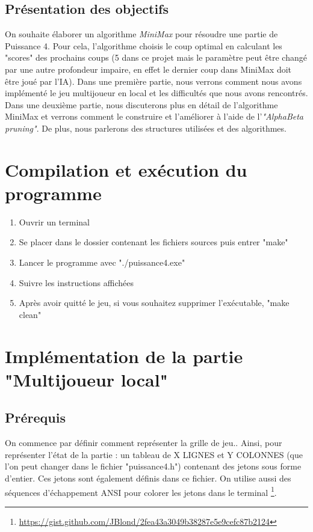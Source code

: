 \documentclass[a4paper,fleqn]{article}
\begin{document}
\subsection{Présentation des objectifs}

On souhaite élaborer un algorithme \textit{MiniMax} pour résoudre une partie de Puissance 4. Pour cela, l'algorithme choisis le coup optimal en calculant les "scores" des prochains coups (5 dans ce projet mais le paramètre peut être changé par une autre profondeur impaire, en effet le dernier coup dans MiniMax doit être joué par l'IA). Dans une première partie, nous verrons comment nous avons implémenté le jeu multijoueur en local et les difficultés que nous avons rencontrés. Dans une deuxième partie, nous discuterons plus en détail de l'algorithme MiniMax et verrons comment le construire et l'améliorer à l'aide de l'\textit{"AlphaBeta pruning"}. De plus, nous parlerons des structures utilisées et des algorithmes.

\section{Compilation et exécution du programme}

\begin{enumerate}
\item Ouvrir un terminal

\item Se placer dans le dossier contenant les fichiers sources puis entrer "make"

\item Lancer le programme avec "./puissance4.exe"

\item Suivre les instructions affichées

\item Après avoir quitté le jeu, si vous souhaitez supprimer l'exécutable, "make clean"
\end{enumerate}

\pagebreak

\section{Implémentation de la partie "Multijoueur local"}

\subsection{Prérequis}
 
On commence par définir comment représenter la grille de jeu.. Ainsi, pour représenter l'état de la partie : un tableau de X LIGNES et Y COLONNES (que l'on peut changer dans le fichier "puissance4.h") contenant des jetons sous forme d'entier. Ces jetons sont également définis dans ce fichier.
On utilise aussi des séquences d'échappement ANSI pour colorer les jetons dans le terminal \footnote{\url{https://gist.github.com/JBlond/2fea43a3049b38287e5e9cefc87b2124}}.\\
\end{document}
